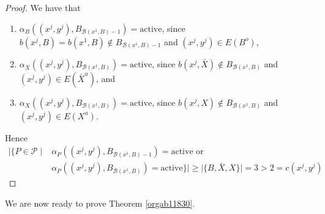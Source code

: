\documentclass[fontsize=11pt,paper=a4]{book}
\begin{document}
\begin{proof}
We have that

\begin{enumerate}
\item \(\alpha_B((x^j,y^j),B_{\mathcal{B}(x^1,B)-1})=\mathrm{active}\), since \(b(x^j,B)=b(x^1,B)\notin B_{\mathcal{B}(x^1,B)-1}\) and \((x^j,y^j)\in E(B^o)\),

\item \(\alpha_{\bar{X}}((x^j,y^j),B_{\mathcal{B}(x^1,B)})=\mathrm{active}\), since \(b(x^j,\bar{X})\notin B_{\mathcal{B}(x^1,B)}\) and \((x^j,y^j)\in E(\bar{X}^u)\), and

\item \(\alpha_{X}((x^j,y^j),B_{\mathcal{B}(x^1,B)})=\mathrm{active}\), since \(b(x^j,X)\notin B_{\mathcal{B}(x^1,B)}\) and \((x^j,y^j)\in E(X^u)\).
\end{enumerate}

Hence
\begin{align*}
\lvert\{P\in\mathcal{P}\mid&\alpha_P((x^j,y^j),B_{\mathcal{B}(x^1,B)-1})=\mathrm{active}\text{ or }\\
&\alpha_P((x^j,y^j),B_{\mathcal{B}(x^1,B)})=\mathrm{active}\}\rvert\geq\lvert\{B,\bar{X},X\}\rvert=3>2=c(x^j,y^j)
\end{align*}
\end{proof}

We are now ready to prove Theorem \ref{orgab11830}.
\end{document}
